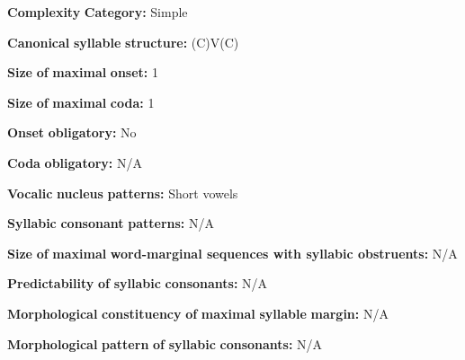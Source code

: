 \begin{styleBody}
\textbf{Complexity} \textbf{Category:} Simple
\end{styleBody}

\begin{styleBody}
\textbf{Canonical} \textbf{syllable} \textbf{structure:} (C)V(C) \citep[30-32]{Guillaume2008}
\end{styleBody}

\begin{styleBody}
\textbf{Size} \textbf{of} \textbf{maximal} \textbf{onset:} 1
\end{styleBody}

\begin{styleBody}
\textbf{Size} \textbf{of} \textbf{maximal} \textbf{coda:} 1
\end{styleBody}

\begin{styleBody}
\textbf{Onset} \textbf{obligatory:} No
\end{styleBody}

\begin{styleBody}
\textbf{Coda} \textbf{obligatory:} N/A
\end{styleBody}

\begin{styleBody}
\textbf{Vocalic} \textbf{nucleus} \textbf{patterns:} Short vowels
\end{styleBody}

\begin{styleBody}
\textbf{Syllabic} \textbf{consonant} \textbf{patterns:} N/A
\end{styleBody}

\begin{styleBody}
\textbf{Size} \textbf{of} \textbf{maximal} \textbf{word{}-marginal sequences with syllabic obstruents:} N/A
\end{styleBody}

\begin{styleBody}
\textbf{Predictability} \textbf{of} \textbf{syllabic} \textbf{consonants:} N/A
\end{styleBody}

\begin{styleBody}
\textbf{Morphological} \textbf{constituency} \textbf{of} \textbf{maximal} \textbf{syllable} \textbf{margin:} N/A
\end{styleBody}

\begin{styleBody}
\textbf{Morphological} \textbf{pattern} \textbf{of} \textbf{syllabic} \textbf{consonants:} N/A
\end{styleBody}

